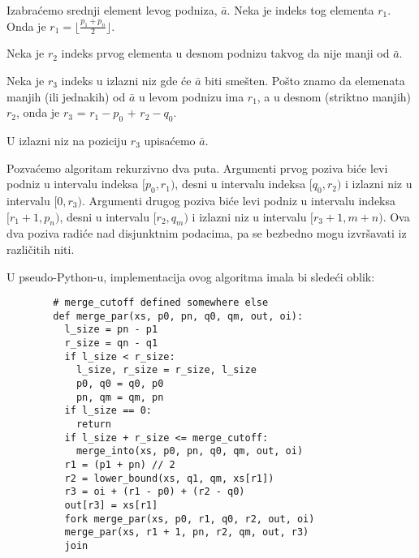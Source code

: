 \documentclass[a4paper,11pt]{article}
\begin{document}
    \begin{itemize}
        \begin{item}
            Izabraćemo srednji element levog podniza, $\bar{a}$. Neka je indeks tog elementa $r_1$. Onda je
            $r_1 = \lfloor \frac{p_1 + p_n}{2} \rfloor$.
        \end{item}
        \begin{item}
            Neka je $r_2$ indeks prvog elementa u desnom podnizu takvog da nije manji od $\bar{a}$.
        \end{item}
        \begin{item}
            Neka je $r_3$ indeks u izlazni niz gde će $\bar{a}$ biti smešten.
            Pošto znamo da elemenata manjih (ili jednakih) od $\bar{a}$ u levom podnizu ima $r_1$, a
            u desnom (striktno manjih) $r_2$, onda je $r_3$ = $r_1 - p_0$ + $r_2 - q_0$.
        \end{item}
        \begin{item}
            U izlazni niz na poziciju $r_3$ upisaćemo $\bar{a}$.
        \end{item}
        \begin{item}
            Pozvaćemo algoritam rekurzivno dva puta. Argumenti prvog poziva biće 
            levi podniz u intervalu indeksa $[p_0 , r_1)$, desni u intervalu
            indeksa $[q_0 , r_2)$ i izlazni niz u intervalu $[0, r_3)$. Argumenti
            drugog poziva biće levi podniz u intervalu indeksa $[r_1 + 1, p_n)$, desni u intervalu
            $[r_2, q_m)$ i izlazni niz u intervalu $[r_3 + 1, m + n)$. Ova dva poziva
            radiće nad disjunktnim podacima, pa se bezbedno mogu izvršavati iz različitih
            niti.
        \end{item}
    \end{itemize}
    U pseudo-Python-u, implementacija ovog algoritma imala bi sledeći oblik:
    \begin{verbatim}
        # merge_cutoff defined somewhere else
        def merge_par(xs, p0, pn, q0, qm, out, oi):
          l_size = pn - p1
          r_size = qn - q1
          if l_size < r_size:
            l_size, r_size = r_size, l_size
            p0, q0 = q0, p0
            pn, qm = qm, pn
          if l_size == 0:
            return
          if l_size + r_size <= merge_cutoff:
            merge_into(xs, p0, pn, q0, qm, out, oi)
          r1 = (p1 + pn) // 2
          r2 = lower_bound(xs, q1, qm, xs[r1])
          r3 = oi + (r1 - p0) + (r2 - q0)
          out[r3] = xs[r1]
          fork merge_par(xs, p0, r1, q0, r2, out, oi)
          merge_par(xs, r1 + 1, pn, r2, qm, out, r3)
          join
    \end{verbatim}
\end{document}
